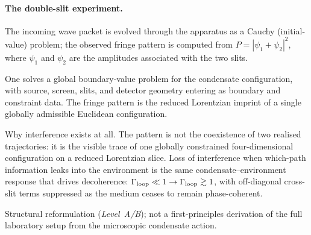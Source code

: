 \documentclass[11pt,a4paper]{article}
\begin{document}
\paragraph{The double-slit experiment.}
\begin{description}[leftmargin=2.8cm, style=nextline]
\item[Standard QM.] The incoming wave packet is evolved through the apparatus as a Cauchy (initial-value) problem; the observed fringe pattern is computed from $P = |\psi_1 + \psi_2|^2$, where $\psi_1$ and $\psi_2$ are the amplitudes associated with the two slits.
\item[ECT (physical picture).] One solves a global boundary-value problem for the condensate configuration, with source, screen, slits, and detector geometry entering as boundary and constraint data.  The fringe pattern is the reduced Lorentzian imprint of a single globally admissible Euclidean configuration.
\item[What this explains.] Why interference exists at all.  The pattern is not the coexistence of two realised trajectories: it is the visible trace of one globally constrained four-dimensional configuration on a reduced Lorentzian slice.  Loss of interference when which-path information leaks into the environment is the same condensate--environment response that drives decoherence: $\Gamma_{\rm loop}\ll 1\to\Gamma_{\rm loop}\gtrsim 1$, with off-diagonal cross-slit terms suppressed as the medium ceases to remain phase-coherent.
\item[Status.] Structural reformulation (\emph{Level~A/B}); not a first-principles derivation of the full laboratory setup from the microscopic condensate action.
\end{description}
\end{document}
